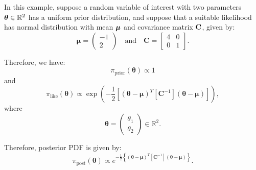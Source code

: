 In this example, suppose a random variable of interest with two parameters $\mbox{\boldmath$ \theta $} \in \mathbb{R}^2$ has a uniform prior distribution, and suppose that a suitable likelihood has normal distribution with mean $\mbox{\boldmath$ \mu $}$ and covariance matrix $\bf{C}$, given by:
\begin{equation}\label{eq-example-mu}
\boldsymbol{\mu} = 
\left(\begin{array}{c}
-1 \\
2
\end{array}\right)
\quad
\text{and}
\quad
\mathbf{C} = 
\left[\begin{array}{cc}
4 & 0 \\
0 & 1
\end{array}\right].
\end{equation}

Therefore, we have: 
\begin{equation*}
\pi_{\text{prior}}(\boldsymbol{\theta}) \varpropto 1
\end{equation*}
and
\begin{equation*}
\pi_{\text{like}}(\boldsymbol{\theta}) \varpropto \exp \left(-\frac{1}{2}\left[(\boldsymbol{\theta}-\boldsymbol{\mu})^T[\mathbf{C}^{-1}](\boldsymbol{\theta}-\boldsymbol{\mu})\right] \right),
\end{equation*}
where
\begin{equation*}
\boldsymbol{\theta} = 
\left(
\begin{array}{c}
\theta_1 \\
\theta_2
\end{array}
\right)\in \mathbb{R}^2.
\end{equation*}
%

Therefore,  posterior PDF is given by:
\begin{equation}\label{eq-example-post}
\pi_{\text{post}}(\boldsymbol{\theta}) \varpropto e^{-\frac{1}{2}\left\{(\boldsymbol{\theta}-\boldsymbol{\mu})^T[\mathbf{C}^{-1}](\boldsymbol{\theta}-\boldsymbol{\mu})\right\}}.
\end{equation}


